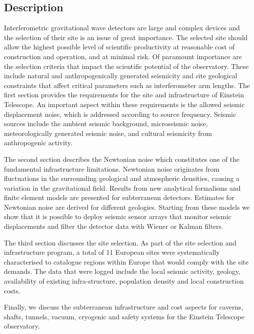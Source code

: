 \FloatBarrier
\subsection{Description}
Interferometric gravitational wave detectors are large and complex devices and the selection of their site is an issue of great importance. The selected site should allow the highest possible level of scientific productivity at reasonable cost of construction and operation, and at minimal risk. Of paramount importance are the selection criteria that impact the scientific potential of the observatory. These include natural and anthropogenically generated seismicity and site geological constraints that affect critical parameters such as interferometer arm lengths. The first section provides the requirements for the site and infrastructure of Einstein Telescope. An important aspect within these requirements is the allowed seismic displacement noise, which is addressed according to source frequency. Seismic sources include the ambient seismic background, microseismic noise, meteorologically generated seismic noise, and cultural seismicity from anthropogenic activity. 

The second section describes the Newtonian noise which constitutes one of the fundamental infrastructure limitations. Newtonian noise originates from fluctuations in the surrounding geological and atmospheric densities, causing a variation in the gravitational field. Results from new analytical formalisms and finite element models are presented for subterranean detectors. Estimates for Newtonian noise are derived for different geologies. Starting from these models we show that it is possible to deploy seismic sensor arrays that monitor seismic displacements and filter the detector data with Wiener or Kalman filters.

The third section discusses the site selection. As part of the site selection and infrastructure program, a total of 11 European sites were systematically characterised to catalogue regions within Europe that would comply with the site demands. The data that were logged include the local seismic activity, geology, availability of existing infra-structure, population density and local construction costs. 

Finally, we discuss the subterranean infrastructure and cost aspects for caverns, shafts, tunnels, vacuum, cryogenic and safety systems for the Einstein Telescope observatory.
\FloatBarrier

